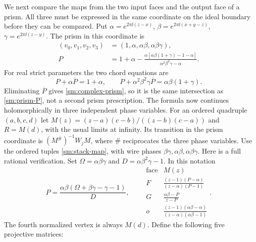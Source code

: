 We next compare the maps from the two input faces and the output
face of a prism. All three must be expressed in the same coordinate
on the ideal boundary before they can be compared.
Put
$\alpha=e^{2\pi\ii(z-x)}$, $\beta=e^{2\pi\ii(x+y-z)}$,
$\gamma=e^{2\pi\ii(z-y)}$. The prism in this coordinate is
\begin{equation}\label{sm:complex-prism}
\begin{split}
 (v_0,v_1,v_2,v_3)&=(1,\alpha,\alpha\beta,\alpha\beta\gamma),\\
 P&=1+\alpha-
 \frac{\alpha[\alpha\beta(1+\gamma)-1-\alpha]}
      {\alpha^2\beta^2\gamma-\alpha}.
\end{split}
\end{equation}
For real strict parameters the two chord equations are
\[
 P+\alpha\overline P=1+\alpha,\qquad
 P+\alpha^2\beta^2\gamma\overline P=\alpha\beta(1+\gamma).
\]
Eliminating $\overline P$ gives \eqref{sm:complex-prism},
so it is the same intersection as \eqref{sm:prism-P}, not
a second prism prescription. The formula now continues
holomorphically in three independent phase variables.
For an ordered quadruple $(a,b,c,d)$ let
$M(z)=(z-a)(c-b)/((z-b)(c-a))$ and $R=M(d)$, with the
usual limits at infinity. Its transition in the prism coordinate is
$(M^\#)^{-1}W_jM$, where $\#$ reciprocates the three phase
variables. Use the ordered tuples \eqref{sm:stack-map}, with
wire phases $\beta\gamma,\alpha\beta,\alpha\beta\gamma$.
Here is a full rational verification. Set
$\Omega=\alpha\beta\gamma$ and $D=\alpha\beta^2\gamma-1$.
In this notation
\[
 P=\frac{\alpha\beta(\Omega+\beta\gamma-\gamma-1)}{D},
 \qquad
 \begin{array}{c|c}
 \text{face}&M(z)\\\hline
 F&\displaystyle\frac{(z-1)(P-\alpha)}{(z-\alpha)(P-1)}\\[2mm]
 G&\displaystyle\frac{\alpha\beta-P}{z-P}\\[2mm]
 o&\displaystyle\frac{(z-1)(\alpha\beta-\alpha)}
                         {(z-\alpha)(\alpha\beta-1)}
 \end{array}.
\]
The fourth normalized vertex is always $M(d)$.
Define the following five projective matrices:

